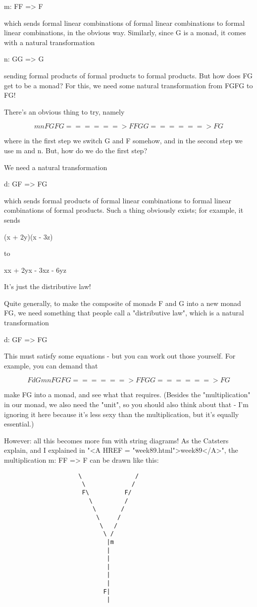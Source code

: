 m: FF => F

which sends formal linear combinations of formal linear combinations
to formal linear combinations, in the obvious way.  Similarly,
since G is a monad, it comes with a natural transformation

n: GG => G

sending formal products of formal products to formal products.
But how does FG get to be a monad?  For this, we need some 
natural transformation from FGFG to FG!

There's an obvious thing to try, namely

$$
                    mn 
FGFG ======> FFGG ======> FG
$$
    
where in the first step we switch G and F somehow, and in the
second step we use m and n.  But, how do we do the first step?

We need a natural transformation

d: GF => FG

which sends formal products of formal linear combinations
to formal linear combinations of formal products.  Such a
thing obviously exists; for example, it sends

(x + 2y)(x - 3z) 

to

xx + 2yx - 3xz - 6yz

It's just the distributive law!  

Quite generally, to make the composite of monads F and 
G into a new monad FG, we need something that people call a
"distributive law", which is a natural transformation

d: GF => FG

This must satisfy some equations - but you can work out
those yourself.  For example, you can demand that

$$
       FdG          mn 
FGFG ======> FFGG ======> FG

$$
    

make FG into a monad, and see what that requires.  (Besides the
"multiplication" in our monad, we also need the
"unit", so you should also think about that - I'm ignoring
it here because it's less sexy than the multiplication, but it's
equally essential.)

However: all this becomes more fun with string diagrams!  As the
Catsters explain, and I explained in "<A HREF =
"week89.html">week89</A>", the multiplication m: FF => F can
be drawn like this:

\begin{verbatim}
                     \               /
                      \             /
                      F\          F/
                        \         /
                         \       /
                          \     /
                           \   /
                            \ /
                             |m               
                             |
                             |
                             |
                             |
                             |
                            F|
                             |
\end{verbatim}
    

